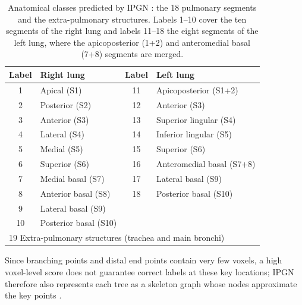 \begin{table}[htbp]                      %
  \centering                             %
  \small                                 %
  \caption{Anatomical classes predicted by IPGN \cite{xie2025}: the 18 pulmonary segments
           and the extra-pulmonary structures. Labels 1--10 cover the ten segments of the
           right lung and labels 11--18 the eight segments of the left lung, where the
           apicoposterior (1+2) and anteromedial basal (7+8) segments are merged.}
  \label{tab:ipgn_labels}                %
  \begin{tabular}{cl@{\hspace{2em}}cl}   %
    \toprule
    Label & Right lung & Label & Left lung \\
    \midrule
    1  & Apical (S1)            & 11 & Apicoposterior (S1+2)     \\
    2  & Posterior (S2)         & 12 & Anterior (S3)             \\
    3  & Anterior (S3)          & 13 & Superior lingular (S4)    \\
    4  & Lateral (S4)           & 14 & Inferior lingular (S5)    \\
    5  & Medial (S5)            & 15 & Superior (S6)             \\
    6  & Superior (S6)          & 16 & Anteromedial basal (S7+8) \\
    7  & Medial basal (S7)      & 17 & Lateral basal (S9)        \\
    8  & Anterior basal (S8)    & 18 & Posterior basal (S10)     \\
    9  & Lateral basal (S9)     &    &                           \\
    10 & Posterior basal (S10)  &    &                           \\
    \midrule
    \multicolumn{4}{l}{19 \quad Extra-pulmonary structures (trachea and main bronchi)} \\
    \bottomrule
  \end{tabular}
\end{table}

Since branching points and distal end points contain very few voxels, a high voxel-level
score does not guarantee correct labels at these key locations; IPGN therefore also
represents each tree as a skeleton graph whose nodes approximate the key points
\cite{xie2025}.

